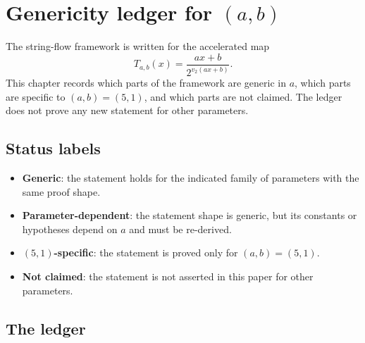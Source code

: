 \section{Genericity ledger for $(a,b)$}

The string-flow framework is written for the accelerated map
\begin{equation*}
  T_{a,b}(x)=\frac{ax+b}{2^{v_2(ax+b)}}.
\end{equation*}
This chapter records which parts of the framework are generic in
$a$, which parts are specific to $(a,b)=(5,1)$, and which parts are
not claimed.  The ledger does not prove any new statement for other
parameters.

\subsection{Status labels}

\begin{itemize}[leftmargin=*]
\item \textbf{Generic}: the statement holds for the indicated family
  of parameters with the same proof shape.
\item \textbf{Parameter-dependent}: the statement shape is generic,
  but its constants or hypotheses depend on $a$ and must be
  re-derived.
\item \textbf{$(5,1)$-specific}: the statement is proved only for
  $(a,b)=(5,1)$.
\item \textbf{Not claimed}: the statement is not asserted in this
  paper for other parameters.
\end{itemize}

\subsection{The ledger}

